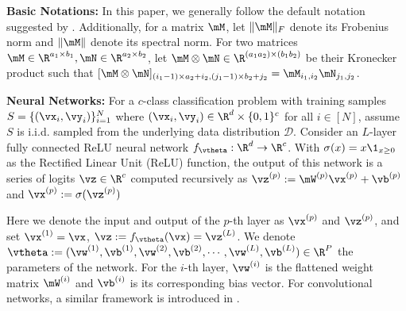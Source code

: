 \label{sec:prelim}
\textbf{Basic Notations:} In this paper, we generally follow the default notation suggested by \citet{goodfellow2016deep}. Additionally, for a matrix $\mM$, let $\|\mM\|_F$ denote its Frobenius norm and $\|\mM\|$ denote its spectral norm. For two matrices $\mM \in \R^{a_1\times b_1}, \mN\in \R^{a_2\times b_2}$, let $\mM \otimes \mN\in\R^{(a_1a_2)\times (b_1b_2)}$ be their Kronecker product such that $[\mM \otimes \mN]_{(i_1-1)\times a_2 + i_2, (j_1-1)\times b_2 + j_2} = \mM_{i_1,i_2} \mN_{j_1,j_2}$.

\textbf{Neural Networks:}
For a $c$-class classification problem with training samples $S = \{(\vx_i, \vy_i)\}_{i=1}^N$ where $(\vx_i,\vy_i)\in\R^d\times \{0,1\}^c$ for all $i\in[N]$, assume $S$ is i.i.d. sampled from the underlying data distribution $\mathcal{D}$. Consider an $L$-layer fully connected ReLU neural network $f_\vtheta: \R^d\to \R^c$. With $\sigma(x) = x\1_{x \geq 0}$ as the Rectified Linear Unit (ReLU) function, the output of this network is a series of logits $\vz \in \R^c$ computed recursively as $ \vz^{(p)} := \mW^{(p)}\vx^{(p)} + \vb^{(p)}$ and $\vx^{(p)} := \sigma(\vz^{(p)})$

Here we denote the input and output of the $p$-th layer as $\vx^{(p)}$ and $\vz^{(p)}$, and set $\vx^{(1)}=\vx$, $\vz := f_\vtheta(\vx)=\vz^{(L)}$.
We denote $\vtheta := (\vw^{(1)}, \vb^{(1)}, \vw^{(2)}, \vb^{(2)},\cdots, \vw^{(L)}, \vb^{(L)})\in\R^P$ the parameters of the network. For the $i$-th layer, $\vw^{(i)}$ is the flattened weight matrix $\mW^{(i)}$ and $\vb^{(i)}$ is its corresponding bias vector. For convolutional networks, a similar framework is introduced in .

